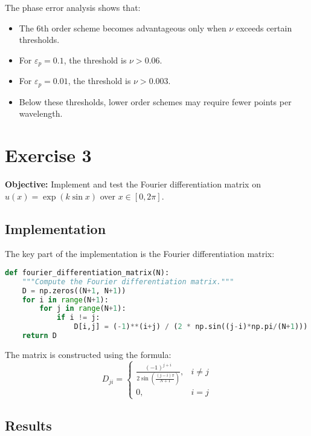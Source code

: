 \documentclass[a4paper, 12pt]{article}
\begin{document}
The phase error analysis shows that:
\begin{itemize}
    \item The 6th order scheme becomes advantageous only when $\nu$ exceeds certain thresholds.
    
    \item For $\varepsilon_p = 0.1$, the threshold is $\nu > 0.06$.
    
    \item For $\varepsilon_p = 0.01$, the threshold is $\nu > 0.003$.
    
    \item Below these thresholds, lower order schemes may require fewer points per wavelength.
\end{itemize}

\section*{Exercise 3}

\textbf{Objective:} Implement and test the Fourier differentiation matrix on $u(x) = \exp(k \sin x)$ over $x \in [0, 2\pi]$.

\subsection*{Implementation}

The key part of the implementation is the Fourier differentiation matrix:

\begin{lstlisting}[language=Python]
def fourier_differentiation_matrix(N):
    """Compute the Fourier differentiation matrix."""
    D = np.zeros((N+1, N+1))
    for i in range(N+1):
        for j in range(N+1):
            if i != j:
                D[i,j] = (-1)**(i+j) / (2 * np.sin((j-i)*np.pi/(N+1)))
    return D
\end{lstlisting}

The matrix is constructed using the formula:
\begin{equation}
    D_{ji} = \begin{cases}
    \frac{(-1)^{j+i}}{2 \sin\left(\frac{(j-i)\pi}{N+1}\right)}, & i \neq j \\
    0, & i = j
    \end{cases}
\end{equation}

\subsection*{Results}
\end{document}
